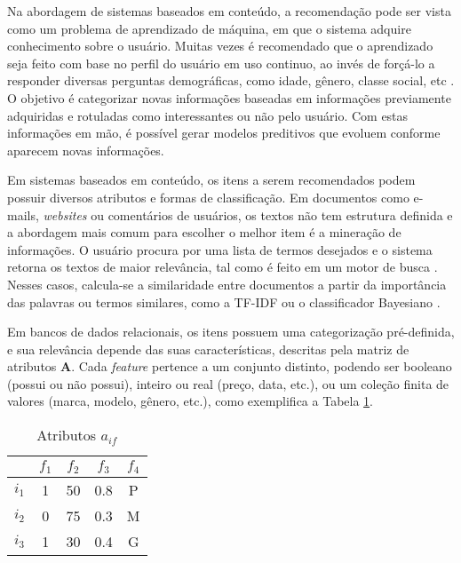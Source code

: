 Na abordagem de sistemas baseados em conteúdo, a recomendação pode ser vista como um problema de aprendizado de máquina, em que o sistema adquire conhecimento sobre o usuário. Muitas vezes é recomendado que o aprendizado seja feito com base no perfil do usuário em uso continuo, ao invés de forçá-lo a responder diversas perguntas demográficas, como idade, gênero, classe social, etc \cite{wei2007survey}. O objetivo é categorizar novas informações baseadas em informações previamente adquiridas e rotuladas como interessantes ou não pelo usuário. Com estas informações em mão, é possível gerar modelos preditivos que evoluem conforme aparecem novas informações.

Em sistemas baseados em conteúdo, os itens a serem recomendados podem possuir diversos atributos e formas de classificação. Em documentos como e-mails, \textit{websites} ou comentários de usuários, os textos não tem estrutura definida e a abordagem mais comum para escolher o melhor item é a mineração de informações. O usuário procura por uma lista de termos desejados e o sistema retorna os textos de maior relevância, tal como é feito em um motor de busca \cite{schafer2001commerce}. Nesses casos, calcula-se a similaridade entre documentos a partir da importância das palavras ou termos similares, como a TF-IDF ou o classificador Bayesiano \cite{lops2011content-chap3}. 

Em bancos de dados relacionais, os itens possuem uma categorização pré-definida, e sua relevância depende das suas características, descritas pela matriz de atributos $\mathbf{A}$. Cada \textit{feature} pertence a um conjunto distinto, podendo ser booleano (possui ou não possui), inteiro ou real (preço, data, etc.), ou um coleção finita de valores (marca, modelo, gênero, etc.), como exemplifica a Tabela \ref{tab:aif}.

\begin{table}[h]
\begin{center}
    \caption{Atributos $a_{if}$}
    \label{tab:aif}
    \begin{tabular}{ | c | c | c | c | c | } 
    \hline
     & $f_1$ & $f_2$ & $f_3$ & $f_4$ \\ \hline
     $i_1$ & 1 & 50 & 0.8 & P \\ \hline
     $i_2$ & 0 & 75 & 0.3 & M \\ \hline
     $i_3$ & 1 & 30 & 0.4 & G \\ \hline
    \end{tabular}
\end{center}
\end{table}

